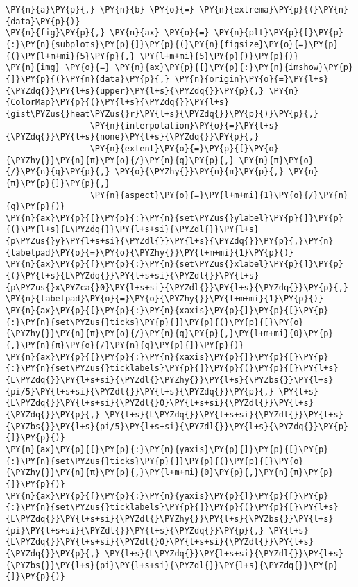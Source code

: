 \begin{Verbatim}[commandchars=\\\{\}]
\PY{n}{a}\PY{p}{,} \PY{n}{b} \PY{o}{=} \PY{n}{extrema}\PY{p}{(}\PY{n}{data}\PY{p}{)}
\PY{n}{fig}\PY{p}{,} \PY{n}{ax} \PY{o}{=} \PY{n}{plt}\PY{p}{[}\PY{p}{:}\PY{n}{subplots}\PY{p}{]}\PY{p}{(}\PY{n}{figsize}\PY{o}{=}\PY{p}{(}\PY{l+m+mi}{5}\PY{p}{,} \PY{l+m+mi}{5}\PY{p}{)}\PY{p}{)}
\PY{n}{img} \PY{o}{=} \PY{n}{ax}\PY{p}{[}\PY{p}{:}\PY{n}{imshow}\PY{p}{]}\PY{p}{(}\PY{n}{data}\PY{p}{,} \PY{n}{origin}\PY{o}{=}\PY{l+s}{\PYZdq{}}\PY{l+s}{upper}\PY{l+s}{\PYZdq{}}\PY{p}{,} \PY{n}{ColorMap}\PY{p}{(}\PY{l+s}{\PYZdq{}}\PY{l+s}{gist\PYZus{}heat\PYZus{}r}\PY{l+s}{\PYZdq{}}\PY{p}{)}\PY{p}{,}
                 \PY{n}{interpolation}\PY{o}{=}\PY{l+s}{\PYZdq{}}\PY{l+s}{none}\PY{l+s}{\PYZdq{}}\PY{p}{,}
                 \PY{n}{extent}\PY{o}{=}\PY{p}{[}\PY{o}{\PYZhy{}}\PY{n}{π}\PY{o}{/}\PY{n}{q}\PY{p}{,} \PY{n}{π}\PY{o}{/}\PY{n}{q}\PY{p}{,} \PY{o}{\PYZhy{}}\PY{n}{π}\PY{p}{,} \PY{n}{π}\PY{p}{]}\PY{p}{,}
                 \PY{n}{aspect}\PY{o}{=}\PY{l+m+mi}{1}\PY{o}{/}\PY{n}{q}\PY{p}{)}
\PY{n}{ax}\PY{p}{[}\PY{p}{:}\PY{n}{set\PYZus{}ylabel}\PY{p}{]}\PY{p}{(}\PY{l+s}{L\PYZdq{}}\PY{l+s+si}{\PYZdl{}}\PY{l+s}{p\PYZus{}y}\PY{l+s+si}{\PYZdl{}}\PY{l+s}{\PYZdq{}}\PY{p}{,}\PY{n}{labelpad}\PY{o}{=}\PY{o}{\PYZhy{}}\PY{l+m+mi}{1}\PY{p}{)}
\PY{n}{ax}\PY{p}{[}\PY{p}{:}\PY{n}{set\PYZus{}xlabel}\PY{p}{]}\PY{p}{(}\PY{l+s}{L\PYZdq{}}\PY{l+s+si}{\PYZdl{}}\PY{l+s}{p\PYZus{}x\PYZca{}0}\PY{l+s+si}{\PYZdl{}}\PY{l+s}{\PYZdq{}}\PY{p}{,} \PY{n}{labelpad}\PY{o}{=}\PY{o}{\PYZhy{}}\PY{l+m+mi}{1}\PY{p}{)}
\PY{n}{ax}\PY{p}{[}\PY{p}{:}\PY{n}{xaxis}\PY{p}{]}\PY{p}{[}\PY{p}{:}\PY{n}{set\PYZus{}ticks}\PY{p}{]}\PY{p}{(}\PY{p}{[}\PY{o}{\PYZhy{}}\PY{n}{π}\PY{o}{/}\PY{n}{q}\PY{p}{,}\PY{l+m+mi}{0}\PY{p}{,}\PY{n}{π}\PY{o}{/}\PY{n}{q}\PY{p}{]}\PY{p}{)}
\PY{n}{ax}\PY{p}{[}\PY{p}{:}\PY{n}{xaxis}\PY{p}{]}\PY{p}{[}\PY{p}{:}\PY{n}{set\PYZus{}ticklabels}\PY{p}{]}\PY{p}{(}\PY{p}{[}\PY{l+s}{L\PYZdq{}}\PY{l+s+si}{\PYZdl{}\PYZhy{}}\PY{l+s}{\PYZbs{}}\PY{l+s}{pi/5}\PY{l+s+si}{\PYZdl{}}\PY{l+s}{\PYZdq{}}\PY{p}{,} \PY{l+s}{L\PYZdq{}}\PY{l+s+si}{\PYZdl{}0}\PY{l+s+si}{\PYZdl{}}\PY{l+s}{\PYZdq{}}\PY{p}{,} \PY{l+s}{L\PYZdq{}}\PY{l+s+si}{\PYZdl{}}\PY{l+s}{\PYZbs{}}\PY{l+s}{pi/5}\PY{l+s+si}{\PYZdl{}}\PY{l+s}{\PYZdq{}}\PY{p}{]}\PY{p}{)}
\PY{n}{ax}\PY{p}{[}\PY{p}{:}\PY{n}{yaxis}\PY{p}{]}\PY{p}{[}\PY{p}{:}\PY{n}{set\PYZus{}ticks}\PY{p}{]}\PY{p}{(}\PY{p}{[}\PY{o}{\PYZhy{}}\PY{n}{π}\PY{p}{,}\PY{l+m+mi}{0}\PY{p}{,}\PY{n}{π}\PY{p}{]}\PY{p}{)}
\PY{n}{ax}\PY{p}{[}\PY{p}{:}\PY{n}{yaxis}\PY{p}{]}\PY{p}{[}\PY{p}{:}\PY{n}{set\PYZus{}ticklabels}\PY{p}{]}\PY{p}{(}\PY{p}{[}\PY{l+s}{L\PYZdq{}}\PY{l+s+si}{\PYZdl{}\PYZhy{}}\PY{l+s}{\PYZbs{}}\PY{l+s}{pi}\PY{l+s+si}{\PYZdl{}}\PY{l+s}{\PYZdq{}}\PY{p}{,} \PY{l+s}{L\PYZdq{}}\PY{l+s+si}{\PYZdl{}0}\PY{l+s+si}{\PYZdl{}}\PY{l+s}{\PYZdq{}}\PY{p}{,} \PY{l+s}{L\PYZdq{}}\PY{l+s+si}{\PYZdl{}}\PY{l+s}{\PYZbs{}}\PY{l+s}{pi}\PY{l+s+si}{\PYZdl{}}\PY{l+s}{\PYZdq{}}\PY{p}{]}\PY{p}{)}

\end{Verbatim}
